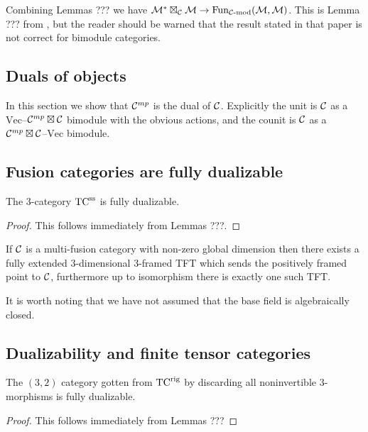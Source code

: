 \documentclass{amsart}
\begin{document}
\begin{remark}
Combining Lemmas ??? we have  $\mathcal M^* \boxtimes_\mathcal C \mathcal M \rightarrow \operatorname{Fun}_{\mathcal C\text{-mod}}(\mathcal M,\mathcal M)$.  This is Lemma ??? from \cite{???}, but the reader should be warned that the result stated in that paper is not correct for bimodule categories. 
\end{remark}

\subsection{Duals of objects} \label{sec-df-objects}

In this section we show that $\mathcal C^{mp}$ is the dual of $\mathcal C$.  Explicitly the unit is $\mathcal C$ as a $\mathrm{Vec}$--$\mathcal C^{mp} \boxtimes \mathcal C$ bimodule with the obvious actions, and the counit is $\mathcal C$ as a $\mathcal C^{mp} \boxtimes \mathcal C$--$\mathrm{Vec}$ bimodule.

\subsection{Fusion categories are fully dualizable}

\begin{theorem}
The $3$-category ${\mathrm{TC}^{\text{ss}}}$ is fully dualizable.
\end{theorem}
\begin{proof}
This follows immediately from Lemmas ???.
\end{proof}

\begin{corollary}
If $\mathcal C$ is a multi-fusion category with non-zero global dimension then there exists a fully extended $3$-dimensional $3$-framed TFT which sends the positively framed point to $\mathcal C$, furthermore up to isomorphism there is exactly one such TFT.
\end{corollary}

\begin{remark}
It is worth noting that we have not assumed that the base field is algebraically closed.
\end{remark}

\subsection{Dualizability and finite tensor categories}

\begin{theorem}
The $(3,2)$ category gotten from ${\mathrm{TC}^{\text{rig}}}$ by discarding all noninvertible $3$-morphisms is fully dualizable.
\end{theorem}
\begin{proof}
This follows immediately from Lemmas ???
\end{proof}
\end{document}
